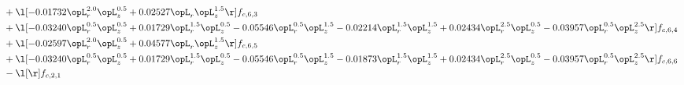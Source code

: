 \begin{alignat}{2}
& + \l[  -0.01732 \opL_r^{2.0} \opL_z^{0.5} +  0.02527 \opL_r \opL_z^{1.5}  \r] f_{c,6,3} \nonumber \\ 
& + \l[  -0.03240 \opL_r^{0.5} \opL_z^{0.5} +  0.01729 \opL_r^{1.5} \opL_z^{0.5}   -0.05546 \opL_r^{0.5} \opL_z^{1.5}   -0.02214 \opL_r^{1.5} \opL_z^{1.5} +  0.02434 \opL_r^{2.5} \opL_z^{0.5}   -0.03957 \opL_r^{0.5} \opL_z^{2.5}  \r] f_{c,6,4} \nonumber \\ 
& + \l[  -0.02597 \opL_r^{2.0} \opL_z^{0.5} +  0.04577 \opL_r \opL_z^{1.5}  \r] f_{c,6,5} \nonumber \\ 
& + \l[  -0.03240 \opL_r^{0.5} \opL_z^{0.5} +  0.01729 \opL_r^{1.5} \opL_z^{0.5}   -0.05546 \opL_r^{0.5} \opL_z^{1.5}   -0.01873 \opL_r^{1.5} \opL_z^{1.5} +  0.02434 \opL_r^{2.5} \opL_z^{0.5}   -0.03957 \opL_r^{0.5} \opL_z^{2.5}  \r] f_{c,6,6} \nonumber \\ 
& - \l[  \r] f_{c,2,1} \nonumber \\ 
\end{alignat} 


